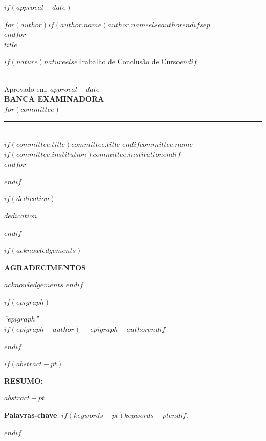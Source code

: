 \documentclass[
  12pt,
  oneside,
  a4paper,
  chapter=TITLE,
  english,
  portuguese
]{abntex2}
\renewcommand{\ABNTEXchapterfont}{\bfseries}
\begin{document}
$if(approval-date)$
\newpage
\thispagestyle{empty}
\begin{center}
  {\ABNTEXchapterfont\bfseries\large
    $for(author)$$if(author.name)$\MakeUppercase{$author.name$}$else$\MakeUppercase{$author$}$endif$$sep$\\$endfor$
  }\\[1cm]
  {\ABNTEXchapterfont\bfseries\large \MakeUppercase{$title$}}\\[1cm]
  \hspace*{8cm}\parbox{8cm}{\normalsize\normalfont
    $if(nature)$$nature$$else$Trabalho de Conclusão de Curso$endif$
  }\\[1cm]
  Aprovado em: $approval-date$\\[2cm]
  {\bfseries BANCA EXAMINADORA}\\[1.5cm]
  $for(committee)$
  \rule{8cm}{0.4pt}\\
  $if(committee.title)$$committee.title$ $endif$$committee.name$\\
  $if(committee.institution)$$committee.institution$$endif$\\[1.5cm]
  $endfor$
\end{center}
$endif$

$if(dedication)$
\newpage
\thispagestyle{empty}
\vspace*{\fill}
\hspace*{8cm}\parbox{8cm}{\normalfont\itshape $dedication$}
$endif$

$if(acknowledgements)$
\newpage
\thispagestyle{empty}
\begin{center}{\ABNTEXchapterfont\bfseries\normalsize AGRADECIMENTOS}\end{center}
\vspace{\onelineskip}
$acknowledgements$
\clearpage
$endif$

$if(epigraph)$
\newpage
\thispagestyle{empty}
\vspace*{\fill}
\hspace*{8cm}\parbox{8cm}{\normalfont\itshape
  ``$epigraph$''\\
  $if(epigraph-author)$\hfill --- $epigraph-author$$endif$
}
$endif$

$if(abstract-pt)$
\newpage
\thispagestyle{empty}
\begin{resumoumacoluna}
\noindent\textbf{RESUMO:}\vspace{\onelineskip}

$abstract-pt$

\vspace{\onelineskip}
\noindent\textbf{Palavras-chave}: $if(keywords-pt)$$keywords-pt$$endif$.
\end{resumoumacoluna}
\clearpage
$endif$
\end{document}
